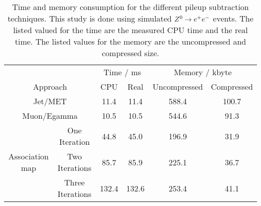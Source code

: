 
\begin{table}[h]
    \begin{center}
        \caption{Time and memory consumption for the different pileup subtraction techniques. This study is done using simulated ${Z^{0}}\rightarrow e^+e^-$ events. The listed valued for the time are the measured CPU time and the real time. The listed values for the memory are the uncompressed and compressed size.}
        \label{tab:OSPTimMemZEE}
        
        \begin{tabular}{c c c c c c}
            & & \multicolumn{2}{c}{Time / ms} & \multicolumn{2}{c}{Memory / kbyte}  \\
            \multicolumn{2}{c}{Approach} & CPU & Real & Uncompressed & Compressed \\
            \midrule[2pt]
            \multicolumn{2}{c}{Jet/MET}  & 11.4 & 11.4 & 588.4 & 100.7 \\
            \midrule
            \multicolumn{2}{c}{Muon/Egamma}  & 10.5 & 10.5 & 544.6 & 91.3 \\
            \midrule
            \multirow{3}{*}{Association map}
            & One Iteration & 44.8 & 45.0 & 196.9 & 31.9 \\
            \cmidrule{2-6}
            & Two Iterations & 85.7 & 85.9 & 225.1 & 36.7 \\
            \cmidrule{2-6}
            & Three Iterations  & 132.4 & 132.6 & 253.4 & 41.1 \\
            
        \end{tabular}
        
    \end{center}
\end{table}